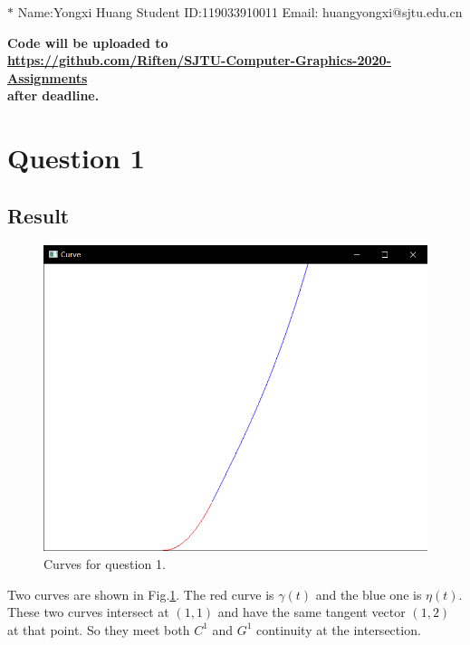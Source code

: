 \documentclass[12pt,a4paper]{article}
\theoremstyle{definition}
\numberwithin{equation}{section}
\numberwithin{figure}{section}
\begin{document}
\noindent

\noindent{}
\begin{center}

\footnotesize{\color{blue}$*$ Name:Yongxi Huang  \quad Student ID:119033910011 \quad Email: huangyongxi@sjtu.edu.cn}
\end{center}

\noindent\textbf{Code will be uploaded to \\
	\url{https://github.com/Riften/SJTU-Computer-Graphics-2020-Assignments}\\
	 after deadline.}

\section{Question 1}
\subsection{Result}
\begin{figure}[htbp]
	\centering
	\includegraphics[width=0.5\linewidth]{curve1.png}
	\caption{Curves for question 1.}
	\label{fig1}
\end{figure}
Two curves are shown in Fig.\ref{fig1}. The red curve is $\gamma(t)$ and the blue one is $\eta(t)$. These two curves intersect at $(1,1)$ and have the same tangent vector $(1,2)$ at that point. So they meet both $C^1$ and $G^1$ continuity at the intersection.
\end{document}

